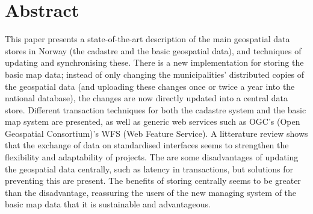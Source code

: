 \section*{Abstract}

This paper presents a state-of-the-art description of the main geospatial data stores in Norway (the cadastre and the basic geospatial data), and techniques of updating and synchronising these. There is a new implementation for storing the basic map data; instead of only changing the municipalities' distributed copies of the geospatial data (and uploading these changes once or twice a year into the national database), the changes are now directly updated into a central data store. 
Different transaction techniques for both the cadastre system and the basic map system are presented, as well as generic web services such as OGC's (Open Geospatial Consortium)'s WFS (Web Feature Service). A litterature review shows that the exchange of data on standardised interfaces seems to strengthen the flexibility and adaptability of projects. 
The are some disadvantages of updating the geospatial data centrally, such as latency in transactions, but solutions for preventing this are present. The benefits of storing centrally seems to be greater than the disadvantage, reassuring the users of the new managing system of the basic map data that it is sustainable and advantageous. 

